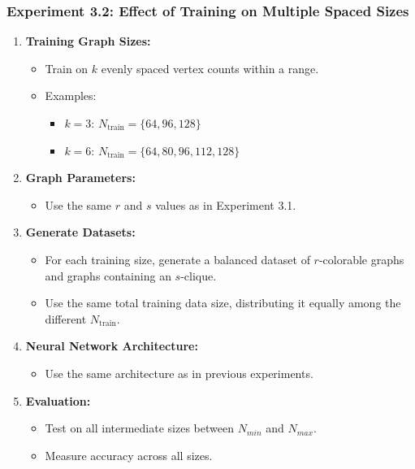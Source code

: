 \subsubsection{Experiment 3.2: Effect of Training on Multiple Spaced Sizes}

\begin{enumerate}
    \item \textbf{Training Graph Sizes:}
    \begin{itemize}
        \item Train on $k$ evenly spaced vertex counts within a range.
        \item Examples:
        \begin{itemize}
            \item $k = 3$: $N_{\text{train}} = \{64, 96, 128 \}$
            \item $k = 6$: $N_{\text{train}} = \{64, 80, 96, 112, 128\}$
        \end{itemize}
    \end{itemize}

    \item \textbf{Graph Parameters:}
    \begin{itemize}
        \item Use the same $r$ and $s$ values as in Experiment 3.1.
    \end{itemize}

    \item \textbf{Generate Datasets:}
    \begin{itemize}
        \item For each training size, generate a balanced dataset of $r$-colorable graphs and graphs containing an $s$-clique.
        \item Use the same total training data size, distributing it equally among the different $N_{\text{train}}$.
    \end{itemize}

    \item \textbf{Neural Network Architecture:}
    \begin{itemize}
        \item Use the same architecture as in previous experiments.
    \end{itemize}

    \item \textbf{Evaluation:}
    \begin{itemize}
        \item Test on all intermediate sizes between $N_{min}$ and $N_{max}$.
        \item Measure accuracy across all sizes.
    \end{itemize}
\end{enumerate}

